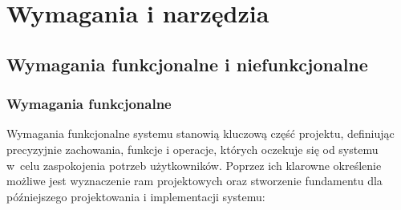 \chapter{Wymagania i narzędzia}
\label{ch:wymagania-i-narzedzia}

\section{Wymagania funkcjonalne i niefunkcjonalne}
\subsection{Wymagania funkcjonalne}

Wymagania funkcjonalne systemu stanowią kluczową część projektu, definiując precyzyjnie zachowania, funkcje i operacje, których oczekuje się od systemu w~celu zaspokojenia potrzeb użytkowników. Poprzez ich klarowne określenie możliwe jest wyznaczenie ram projektowych oraz stworzenie fundamentu dla późniejszego projektowania i implementacji systemu:

